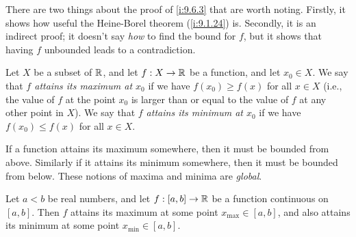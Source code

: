 \begin{rmk}\label{i:9.6.4}
  There are two things about the proof of \cref{i:9.6.3} that are worth noting.
  Firstly, it shows how useful the Heine-Borel theorem (\cref{i:9.1.24}) is.
  Secondly, it is an indirect proof;
  it doesn't say \emph{how} to find the bound for \(f\), but it shows that having \(f\) unbounded leads to a contradiction.
\end{rmk}

\begin{defn}\label{i:9.6.5}
  Let \(X\) be a subset of \(\mathbb{R}\), and let \(f : X \to \mathbb{R}\) be a function, and let \(x_0 \in X\).
  We say that \emph{\(f\) attains its maximum at \(x_0\)} if we have \(f(x_0) \geq f(x)\) for all \(x \in X\)
  (i.e., the value of \(f\) at the point \(x_0\) is larger than or equal to the value of \(f\) at any other point in \(X\)).
  We say that \emph{\(f\) attains its minimum at \(x_0\)} if we have \(f(x_0) \leq f(x)\) for all \(x \in X\).
\end{defn}

\begin{rmk}\label{i:9.6.6}
  If a function attains its maximum somewhere, then it must be bounded from above.
  Similarly if it attains its minimum somewhere, then it must be bounded from below.
  These notions of maxima and minima are \emph{global}.
\end{rmk}

\begin{prop}\label{i:9.6.7}
  Let \(a < b\) be real numbers, and let \(f : [a, b] \to \mathbb{R}\) be a function continuous on \([a, b]\).
  Then \(f\) attains its maximum at some point \(x_{\max} \in [a, b]\), and also attains its minimum at some point \(x_{\min} \in [a, b]\).
\end{prop}

